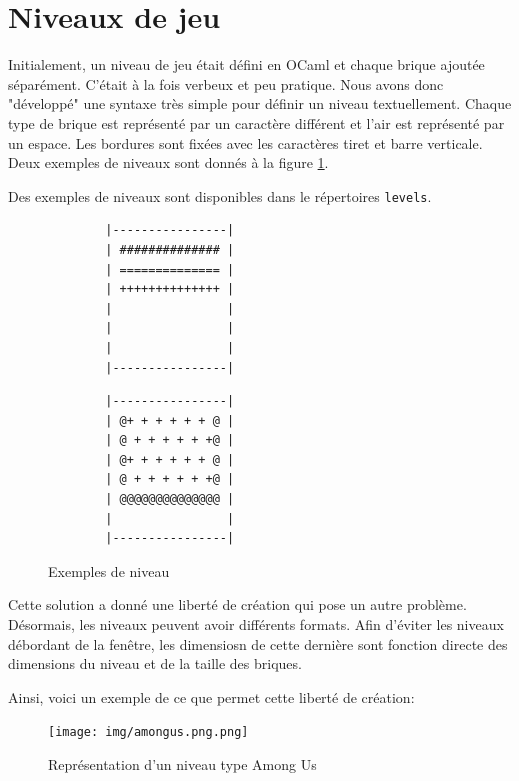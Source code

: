 \documentclass[french]{template}
\begin{document}
\section{Niveaux de jeu}

Initialement, un niveau de jeu était défini en OCaml et chaque brique ajoutée séparément. C'était à la fois verbeux et peu pratique. Nous avons donc "développé" une syntaxe très simple pour définir un niveau textuellement. Chaque type de brique est représenté par un caractère différent et l'air est représenté par un espace. Les bordures sont fixées avec les caractères tiret et barre verticale. Deux exemples de niveaux sont donnés à la figure \ref{fig:level.txt}.

Des exemples de niveaux sont disponibles dans le répertoires \texttt{levels}.

\begin{figure}[ht]
    \begin{minipage}{0.4\textwidth}
        \begin{verbatim}
        |----------------|
        | ############## |
        | ============== |
        | ++++++++++++++ |
        |                |
        |                |
        |                |
        |----------------|
        \end{verbatim}
    \end{minipage}
    \hfill
    \begin{minipage}{0.4\textwidth}
        \begin{verbatim}
        |----------------|
        | @+ + + + + + @ |
        | @ + + + + + +@ |
        | @+ + + + + + @ |
        | @ + + + + + +@ |
        | @@@@@@@@@@@@@@ |
        |                |
        |----------------|
        \end{verbatim}
    \end{minipage}
    \caption{Exemples de niveau}
    \label{fig:level.txt}
\end{figure}

Cette solution a donné une liberté de création qui pose un autre problème. Désormais, les niveaux peuvent avoir différents formats. Afin d'éviter les niveaux débordant de la fenêtre, les dimensiosn de cette dernière sont fonction directe des dimensions du niveau et de la taille des briques.

Ainsi, voici un exemple de ce que permet cette liberté de création:

\begin{figure}[ht]
    \centering
    \texttt{[image: img/amongus.png.png]}
    \caption{Représentation d'un niveau type Among Us}
    \label{fig:amongus}
\end{figure}
\end{document}
